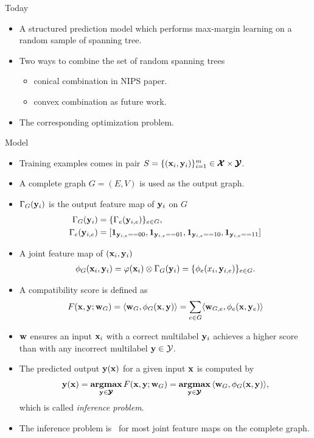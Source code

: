 \documentclass[first=dgreen,second=purple,logo=yellowexc]{aaltoslides}
\begin{document}
%
\begin{frame}{Today}
	\begin{itemize}\footnotesize
		\item A structured prediction model which performs max-margin learning on a random sample of spanning tree.
		\item Two ways to combine the set of random spanning trees
		\begin{itemize}\footnotesize
			\item conical combination in NIPS paper.
			\item convex combination as future work.
		\end{itemize}
		\item The corresponding optimization problem.
	\end{itemize}
\end{frame}



%
\begin{frame}[allowframebreaks]{Model}
	\begin{itemize}\footnotesize
		\item Training examples comes in pair $S=\{(\mathbf {x}_i,\mathbf {y}_i)\}_{i=1}^{m}\in\pmb {\mathcal{X}}\times\pmb {\mathcal{Y}}$.
		\item A complete graph $G=(E,V)$ is used as the output graph.
		\item $\Gamma_G(\mathbf {y}_i)$ is the output feature map of $\mathbf {y}_i$ on $G$
		\begin{align*}
			\Gamma_G(\mathbf {y}_i) &= \{\Gamma_e(\mathbf {y}_{i,e})\}_{e\in G},\\
			 \Gamma_e(\mathbf {y}_{i,e}) &= [\mathbf {1}_{\mathbf {y}_{i,e}==00},\mathbf {1}_{\mathbf {y}_{i,e}==01},\mathbf {1}_{\mathbf {y}_{i,e}==10},\mathbf {1}_{\mathbf {y}_{i,e}==11}]
		\end{align*}
		\item A joint feature map of $(\mathbf {x}_i,\mathbf {y}_i)$
		\begin{align*}
			\phi_G(\mathbf {x}_i,\mathbf {y}_i) = \varphi(\mathbf {x}_i)\otimes\Gamma_G(\mathbf {y}_i) = \{\phi_e(x_i,\mathbf {y}_{i,e})\}_{e\in G}.
		\end{align*}
		\item A compatibility score is defined as
		\begin{align*}
			F(\mathbf {x},\mathbf {y};\mathbf {w}_G) = \langle \mathbf {w}_G, \phi_G(\mathbf {x},\mathbf {y}) \rangle=\sum_{e\in G}\langle \mathbf {w}_{G,e}, \phi_e(\mathbf {x},\mathbf {y}_{e}) \rangle
		\end{align*}
		\item $\mathbf {w}$ ensures an input $\mathbf {x}_i$ with a correct multilabel $\mathbf {y}_i$ achieves a higher score than with any incorrect multilabel $\mathbf {y}\in\mathcal{Y}$.
		\item The predicted output $\mathbf {y}(\mathbf {x})$ for a given input $\mathbf {x}$ is computed by
		\begin{align*}
			\mathbf {y}(\mathbf {x}) = \underset{\mathbf {y}\in\pmb {\mathcal{Y}}}{\textbf{argmax}}\,F(\mathbf {x},\mathbf {y};\mathbf {w}_G) = \underset{\mathbf {y}\in\pmb {\mathcal{Y}}}{\textbf{argmax}}\,\langle \mathbf {w}_G, \phi_G(\mathbf {x},\mathbf {y}) \rangle,
		\end{align*}
		which is called \textit{inference problem}.
		\item The {inference problem} is \nphard\ for most joint feature maps on the complete graph.
	\end{itemize}
\end{frame}
\end{document}
